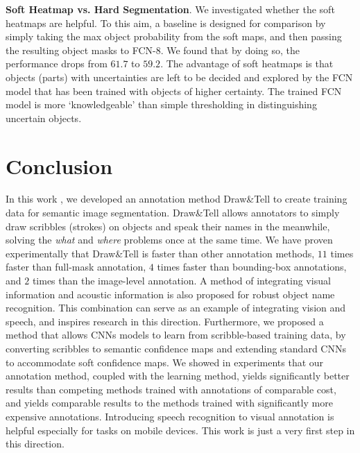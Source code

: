 \textbf{Soft Heatmap vs. Hard Segmentation}. We investigated whether
the soft heatmaps are helpful. To this aim, a baseline is designed for
comparison by simply taking the max object probability from the soft
maps, and then passing the resulting object masks to FCN-8.  We found
that by doing so, the performance drops from $61.7$ to $59.2$. The
advantage of soft heatmaps is that objects (parts) with uncertainties
are left to be decided and explored by the FCN model that has been
trained with objects of higher certainty. The trained FCN model is
more ‘knowledgeable’ than simple thresholding in distinguishing
uncertain objects.


\section{Conclusion}
\label{drawtell:sec:con}
In this work , we developed an annotation method Draw\&Tell to create
training data for semantic image segmentation. Draw\&Tell allows
annotators to simply draw scribbles (strokes) on objects and speak
their names in the meanwhile, solving the \emph{what} and \emph{where}
problems once at the same time. We have proven experimentally that
Draw\&Tell is faster than other annotation methods, \eg $11$ times
faster than full-mask annotation, $4$ times faster than bounding-box
annotations, and $2$ times than the image-level annotation. A method
of integrating visual information and acoustic information is also
proposed for robust object name recognition. This combination can
serve as an example of integrating vision and speech, and inspires
research in this direction. Furthermore, we proposed a method that
allows CNNs models to learn from scribble-based training data, by
converting scribbles to semantic confidence maps and extending
standard CNNs to accommodate soft confidence maps. We showed in
experiments that our annotation method, coupled with the learning
method, yields significantly better results than competing methods
trained with annotations of comparable cost, and yields comparable
results to the methods trained with significantly more expensive
annotations.  Introducing speech recognition to visual annotation is
helpful especially for tasks on mobile devices. This work is just a
very first step in this direction.


